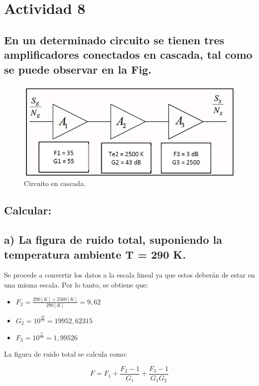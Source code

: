 \section{Actividad 8}

\subsection*{En un determinado circuito se tienen tres amplificadores conectados en cascada, tal
como se puede observar en la Fig. }

    \begin{figure}[H]
        \centering
        \includegraphics[width=0.8\linewidth]{imagenes/Actividad_8/actividad_8.jpg}
        \caption{Circuito en cascada.}
        \label{fig:diagrama_8}
    \end{figure}

\subsection*{Calcular:}

\subsection*{a) La figura de ruido total, suponiendo la temperatura ambiente T = 290 K.}


	Se procede a convertir los datos a la escala lineal ya que estos deberán de estar en una misma escala. Por lo tanto, se obtiene que:
	
	\begin{itemize}
		\item $ F_2 = \frac{290 [K] + 2500 [K]}{290 [K]} = 9,62$
		\item $ G_2 = 10^\frac{43}{10} = 19952,62315$
		\item $ F_3 = 10^\frac{3}{10} = 1,99526$
	\end{itemize}
	
	La figura de ruido total se calcula como:
	
	\[
		F = F_1 + \frac{F_2 - 1}{G_1} + \frac{F_3 - 1}{G_1 G_2}
	\]

